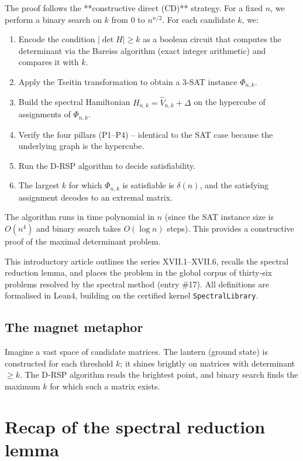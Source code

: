 \documentclass[11pt,a4paper]{article}
\begin{document}
The proof follows the **constructive direct (CD)** strategy. For a fixed $n$, we perform a binary search on $k$ from $0$ to $n^{n/2}$. For each candidate $k$, we:
\begin{enumerate}
\item Encode the condition $|\det H| \ge k$ as a boolean circuit that computes the determinant via the Bareiss algorithm (exact integer arithmetic) and compares it with $k$.
\item Apply the Tseitin transformation to obtain a 3‑SAT instance $\Phi_{n,k}$.
\item Build the spectral Hamiltonian $H_{n,k} = \hat{V}_{n,k} + \Delta$ on the hypercube of assignments of $\Phi_{n,k}$.
\item Verify the four pillars (P1–P4) – identical to the SAT case because the underlying graph is the hypercube.
\item Run the D‑RSP algorithm to decide satisfiability.
\item The largest $k$ for which $\Phi_{n,k}$ is satisfiable is $\delta(n)$, and the satisfying assignment decodes to an extremal matrix.
\end{enumerate}
The algorithm runs in time polynomial in $n$ (since the SAT instance size is $O(n^4)$ and binary search takes $O(\log n)$ steps). This provides a constructive proof of the maximal determinant problem.

This introductory article outlines the series XVII.1–XVII.6, recalls the spectral reduction lemma, and places the problem in the global corpus of thirty‑six problems resolved by the spectral method (entry \#17). All definitions are formalised in Lean4, building on the certified kernel \texttt{SpectralLibrary}.

\subsection{The magnet metaphor}

Imagine a vast space of candidate matrices. The lantern (ground state) is constructed for each threshold $k$; it shines brightly on matrices with determinant $\ge k$. The D‑RSP algorithm reads the brightest point, and binary search finds the maximum $k$ for which such a matrix exists.

\section{Recap of the spectral reduction lemma}
\end{document}
